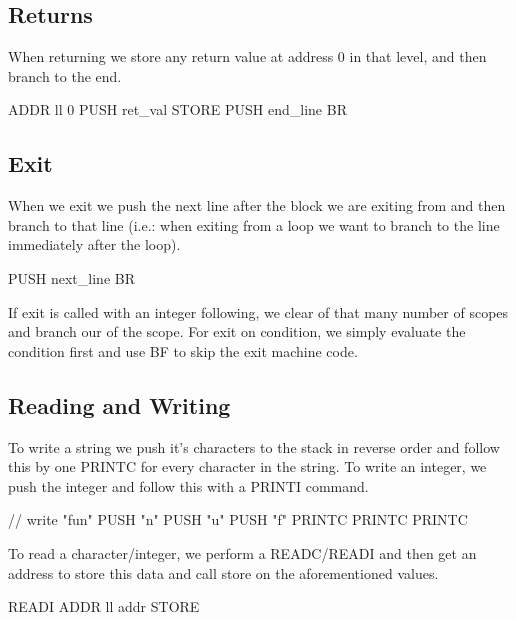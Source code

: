 \subsection{Returns}

When returning we store any return value at address 0 in that level, and then
branch to the end.

\begin{code}[IfStatement]
ADDR ll 0
PUSH ret_val
STORE
PUSH end_line
BR
\end{code}

\subsection{Exit}

When we exit we push the next line after the block we are exiting from and then
branch to that line (i.e.: when exiting from a loop we want to branch to the line
immediately after the loop).

\begin{code}[Exit]
PUSH next_line
BR
\end{code}

If exit is called with an integer following, we clear of that many number of
scopes and branch our of the scope. For exit on condition, we simply evaluate the
condition first and use BF to skip the exit machine code.

\subsection{Reading and Writing}

To write a string we push it's characters to the stack in reverse order and follow
this by one PRINTC for every character in the string. To write an integer, we push
the integer and follow this with a PRINTI command.

\begin{code}[Writing]
// write "fun"
PUSH "n"
PUSH "u"
PUSH "f"
PRINTC
PRINTC
PRINTC
\end{code}

To read a character/integer, we perform a READC/READI and then get an address to 
store this data and call store on the aforementioned values.

\begin{code}[Writing]
READI
ADDR ll addr
STORE
\end{code}
